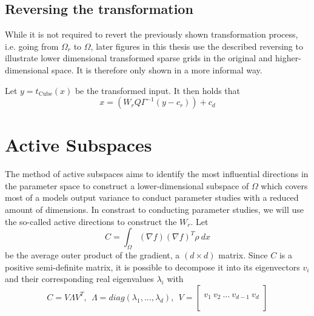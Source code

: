 \documentclass[
  a4paper,  %
  twoside,  %
  bibliography=totoc,
  headsepline,
  cleardoublepage=empty,
  parskip=half,
  draft=false
]{scrbook}
\begin{document}
\section{Reversing the transformation}

While it is not required to revert the previously shown transformation process, i.e. going from $\Omega_r$ to $\Omega$, later figures in this thesis use the described reversing to illustrate lower dimensional transformed sparse grids in the original and higher-dimensional space.
It is therefore only shown in a more informal way.

Let $y=t_{\text{Cube}}(x)$ be the transformed input. It then holds that
\begin{equation}
x=(W_r Q \Gamma^{-1} (y - c_r)) + c_d
\end{equation}

\chapter{Active Subspaces}


The method of active subspaces \cite{CG15} aims to identify the most influential directions in the parameter space to construct a lower-dimensional subspace of $\Omega$ which covers most of a models output variance to conduct parameter studies with a reduced amount of dimensions.
In constrast to conducting parameter studies, we will use the so-called active directions to construct the $W_r$.
Let
\begin{equation}
C = \int_{\Omega} (\nabla f) (\nabla f)^T \rho ~ dx
\label{as_c}
\end{equation}
be the average outer product of the gradient, a $(d \times d)$ matrix.
Since $C$ is a positive semi-definite matrix, it is possible to decompose it into its eigenvectors $v_i$ and their corresponding real eigenvalues $\lambda_i$ with
\begin{equation}
C = V \Lambda V^T, ~~ \Lambda = diag(\lambda_1, ..., \lambda_d), ~~ V=
  \begin{bmatrix}
  \\
    v_1 ~ v_2 ~ \dots ~ v_{d-1} ~ v_d\\
    \\
  \end{bmatrix}
\nonumber
\end{equation}
\end{document}
